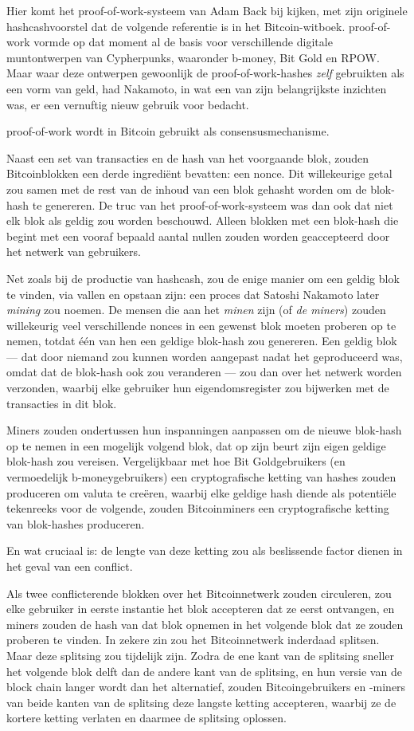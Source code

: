 \documentclass[smalldemyvopaper,11pt,twoside,onecolumn,openright,extrafontsizes,hidelinks]{memoir}
\begin{document}
Hier komt het proof-of-work-systeem van Adam Back bij kijken, met zijn
originele hashcashvoorstel dat de volgende referentie is in het
Bitcoin-witboek. proof-of-work vormde op dat moment al de basis voor
verschillende digitale muntontwerpen van Cypherpunks, waaronder b-money,
Bit Gold en RPOW. Maar waar deze ontwerpen gewoonlijk de
proof-of-work-hashes \emph{zelf} gebruikten als een vorm van geld, had
Nakamoto, in wat een van zijn belangrijkste inzichten was, er een
vernuftig nieuw gebruik voor bedacht.

proof-of-work wordt in Bitcoin gebruikt als consensusmechanisme.

Naast een set van transacties en de hash van het voorgaande blok, zouden
Bitcoinblokken een derde ingrediënt bevatten: een nonce. Dit
willekeurige getal zou samen met de rest van de inhoud van een blok
gehasht worden om de blok-hash te genereren. De truc van het
proof-of-work-systeem was dan ook dat niet elk blok als geldig zou
worden beschouwd. Alleen blokken met een blok-hash die begint met een
vooraf bepaald aantal nullen zouden worden geaccepteerd door het netwerk
van gebruikers.

Net zoals bij de productie van hashcash, zou de enige manier om een
geldig blok te vinden, via vallen en opstaan zijn: een proces dat
Satoshi Nakamoto later \emph{mining} zou noemen. De mensen die aan het
\emph{minen} zijn (of \emph{de miners}) zouden willekeurig veel
verschillende nonces in een gewenst blok moeten proberen op te nemen,
totdat één van hen een geldige blok-hash zou genereren. Een geldig blok
--- dat door niemand zou kunnen worden aangepast nadat het geproduceerd
was, omdat dat de blok-hash ook zou veranderen --- zou dan over het
netwerk worden verzonden, waarbij elke gebruiker hun eigendomsregister
zou bijwerken met de transacties in dit blok.

Miners zouden ondertussen hun inspanningen aanpassen om de nieuwe
blok-hash op te nemen in een mogelijk volgend blok, dat op zijn beurt
zijn eigen geldige blok-hash zou vereisen. Vergelijkbaar met hoe Bit
Goldgebruikers (en vermoedelijk b-moneygebruikers) een cryptografische
ketting van hashes zouden produceren om valuta te creëren, waarbij elke
geldige hash diende als potentiële tekenreeks voor de volgende, zouden
Bitcoinminers een cryptografische ketting van blok-hashes produceren.

En wat cruciaal is: de lengte van deze ketting zou als beslissende
factor dienen in het geval van een conflict.

Als twee conflicterende blokken over het Bitcoinnetwerk zouden
circuleren, zou elke gebruiker in eerste instantie het blok accepteren
dat ze eerst ontvangen, en miners zouden de hash van dat blok opnemen in
het volgende blok dat ze zouden proberen te vinden. In zekere zin zou
het Bitcoinnetwerk inderdaad splitsen. Maar deze splitsing zou tijdelijk
zijn. Zodra de ene kant van de splitsing sneller het volgende blok delft
dan de andere kant van de splitsing, en hun versie van de block chain
langer wordt dan het alternatief, zouden Bitcoingebruikers en -miners
van beide kanten van de splitsing deze langste ketting accepteren,
waarbij ze de kortere ketting verlaten en daarmee de splitsing oplossen.
\end{document}
